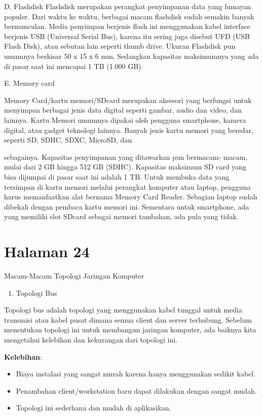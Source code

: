 \documentclass[11pt]{article}
\begin{document}
D. Flashdisk
Flashdisk merupakan perangkat penyimpanan data yang lumayan
populer. Dari waktu ke waktu, berbagai macam flashdisk sudah semakin
banyak bermunculan. Media penyimpan berjenis flash ini menggunakan
kabel interface berjenis USB (Universal Serial Bus), karena itu sering juga
disebut UFD (USB Flash Disk), atau sebutan lain seperti thumb drive.
Ukuran Flashdisk pun umumnya berkisar 50 x 15 x 6 mm. Sedangkan
kapasitas maksimumnya yang ada di pasar saat ini mencapai 1 TB (1.000
GB).


E. Memory card

Memory Card/kartu memori/SDcard merupakan aksesori yang berfungsi
untuk menyimpan berbagai jenis data digital seperti gambar, audio dan
video, dan lainnya. Kartu Memori umumnya dipakai oleh pengguna
smartphone, kamera digital, atau gadget teknologi lainnya. Banyak jenis
kartu memori yang beredar, seperti SD, SDHC, SDXC, MicroSD, dan

sebagainya. Kapasitas penyimpanan yang ditawarkan pun bermacam-
macam, mulai dari 2 GB hingga 512 GB (SDHC). Kapasitas maksimum SD
card yang bisa dijumpai di pasar saat ini adalah 1 TB. Untuk membuka
data yang tersimpan di kartu memori melalui perangkat komputer atau
laptop, pengguna harus memanfaatkan alat bernama Memory Card
Reader. Sebagian laptop sudah dibekali dengan pembaca kartu memori
ini. Sementara untuk smartphone, ada yang memiliki slot SDcard sebagai
memori tambahan, ada pula yang tidak.

\section{Halaman 24}
\label{sec:org9902f87}

Macam-Macam Topologi Jaringan Komputer

\begin{enumerate}
\item Topologi Bus
\end{enumerate}
Topologi bus adalah topologi yang menggunakan kabel tunggal untuk media transmisi atau kabel pusat dimana semua client dan server terhubung. Sebelum menentukan topologi ini untuk membangun jaringan komputer, ada baiknya kita mengetahui kelebihan dan kekurangan dari topologi ini.

\textbf{Kelebihan}:
\begin{itemize}
\item Biaya instalasi yang sangat murah karena hanya menggunakan sedikit kabel.
\item Penambahan client/workstation baru dapat dilakukan dengan sangat mudah.
\item Topologi ini sederhana dan mudah di aplikasikan.
\end{itemize}
\end{document}
